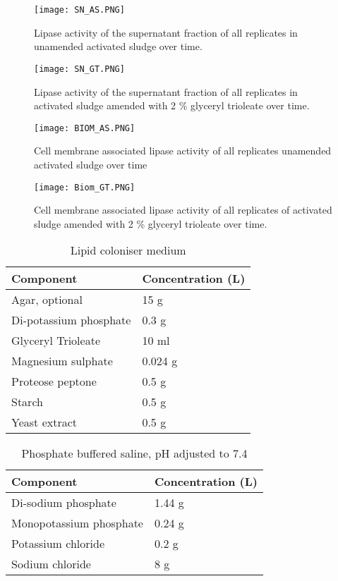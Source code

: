 \documentclass[twoside]{article}
\begin{document}
\begin{figure}
\texttt{[image: SN\_AS.PNG]}
\caption{Lipase activity of the supernatant fraction of all replicates in unamended activated sludge over time.}
\end{figure}
\begin{figure}
\texttt{[image: SN\_GT.PNG]}
\caption{Lipase activity of the supernatant fraction of all replicates in activated sludge amended with 2 \% glyceryl trioleate over time.}
\end{figure}

\begin{figure}
\texttt{[image: BIOM\_AS.PNG]}
\caption{Cell membrane associated lipase activity of all replicates unamended activated sludge over time}
\end{figure}

\begin{figure}
\texttt{[image: Biom\_GT.PNG]}
\caption{Cell membrane associated lipase activity of all replicates of activated sludge amended with 2 \% glyceryl trioleate over time.}
\end{figure}
\FloatBarrier

\begin{table}
\caption{Lipid coloniser medium}
\begin{tabular}{  p{6.9cm} | p{6.9cm} }
\hline
Component & Concentration (L) \\
\hline
Agar, optional  & 15 g  \\
  Di-potassium phosphate  & 0.3 g \\
   Glyceryl Trioleate   & 10 ml \\
      Magnesium sulphate  & 0.024 g  \\
       Proteose peptone   & 0.5 g \\
          Starch  & 0.5 g \\
           Yeast extract   & 0.5 g \\
  \hline
\end{tabular}
\end{table}


\begin{table}
\caption{Phosphate buffered saline, pH adjusted to 7.4}
\begin{tabular}{  p{6.9cm} | p{6.9cm}  }
\hline
Component & Concentration (L) \\
\hline
Di-sodium phosphate  & 1.44 g \\
  Monopotassium phosphate  & 0.24 g  \\
    Potassium chloride  &  0.2 g  \\
      Sodium chloride  & 8 g  \\
  \hline
\end{tabular}
\end{table}
\end{document}
